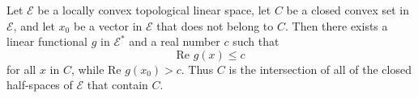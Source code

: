 Let $\mathcal{E}$ be a locally convex topological linear space, let $C$ be a closed convex set in $\mathcal{E}$, and let $x_0$ be a vector in $\mathcal{E}$ that does not belong to $C$. Then there exists a linear functional $g$ in $\mathcal{E}^*$ and a real number $c$ such that
$$\text{Re } g(x) \leq c$$
for all $x$ in $C$, while $\text{Re } g(x_0) > c$. Thus $C$ is the intersection of all of the closed half-spaces of $\mathcal{E}$ that contain $C$.
